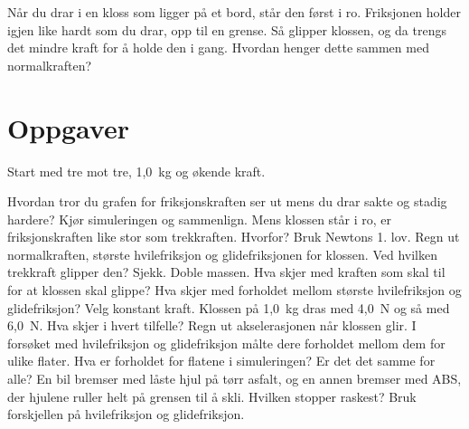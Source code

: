 \documentclass[11pt]{article}
\begin{document}

Når du drar i en kloss som ligger på et bord, står den først i ro. Friksjonen holder igjen like hardt som du drar, opp til en grense. Så glipper klossen, og da trengs det mindre kraft for å holde den i gang. Hvordan henger dette sammen med normalkraften?

\section*{Oppgaver}

Start med tre mot tre, 1,0~kg og økende kraft.

\begin{oppgaveliste}
\oppgave {}Hvordan tror du grafen for friksjonskraften ser ut mens du drar sakte og stadig hardere? Kjør simuleringen og sammenlign.
\svar
\oppgave {}Mens klossen står i ro, er friksjonskraften like stor som trekkraften. Hvorfor? Bruk Newtons 1. lov.
\svar
\oppgave {}Regn ut normalkraften, største hvilefriksjon og glidefriksjonen for klossen. Ved hvilken trekkraft glipper den? Sjekk.
\svar
\oppgave {}Doble massen. Hva skjer med kraften som skal til for at klossen skal glippe? Hva skjer med forholdet mellom største hvilefriksjon og glidefriksjon?
\svar
\oppgave {}Velg konstant kraft. Klossen på 1,0~kg dras med 4,0~N og så med 6,0~N. Hva skjer i hvert tilfelle? Regn ut akselerasjonen når klossen glir.
\svar
\oppgave {}I forsøket med hvilefriksjon og glidefriksjon målte dere forholdet mellom dem for ulike flater. Hva er forholdet for flatene i simuleringen? Er det det samme for alle?
\svar
\oppgave {}En bil bremser med låste hjul på tørr asfalt, og en annen bremser med ABS, der hjulene ruller helt på grensen til å skli. Hvilken stopper raskest? Bruk forskjellen på hvilefriksjon og glidefriksjon.
\svar
\end{oppgaveliste}
\end{document}
